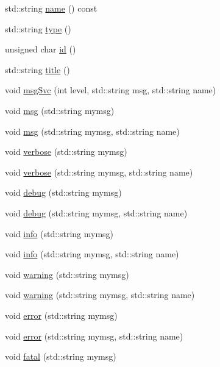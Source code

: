 \begin{DoxyCompactItemize}
\item 
std::string \hyperlink{classObject_a975e888d50bfcbffda2c86368332a5cd}{name} () const 
\item 
std::string \hyperlink{classObject_a84f99f70f144a83e1582d1d0f84e4e62}{type} ()
\item 
unsigned char \hyperlink{classObject_af99145335cc61ff6e2798ea17db009d2}{id} ()
\item 
std::string \hyperlink{classObject_a73a0f1a41828fdd8303dd662446fb6c3}{title} ()
\item 
void \hyperlink{classObject_a3f9d5537ebce0c0f2bf6ae4d92426f3c}{msgSvc} (int level, std::string msg, std::string name)
\item 
void \hyperlink{classObject_a58b2d0618c2d08cf2383012611528d97}{msg} (std::string mymsg)
\item 
void \hyperlink{classObject_ac5d59299273cee27aacf7de00d2e7034}{msg} (std::string mymsg, std::string name)
\item 
void \hyperlink{classObject_a83d2db2df682907ea1115ad721c1c4a1}{verbose} (std::string mymsg)
\item 
void \hyperlink{classObject_a2d4120195317e2a3c6532e8bb9f3da68}{verbose} (std::string mymsg, std::string name)
\item 
void \hyperlink{classObject_aac010553f022165573714b7014a15f0d}{debug} (std::string mymsg)
\item 
void \hyperlink{classObject_a6c9a0397ca804e04d675ed05683f5420}{debug} (std::string mymsg, std::string name)
\item 
void \hyperlink{classObject_a644fd329ea4cb85f54fa6846484b84a8}{info} (std::string mymsg)
\item 
void \hyperlink{classObject_a1ca123253dfd30fc28b156f521dcbdae}{info} (std::string mymsg, std::string name)
\item 
void \hyperlink{classObject_a65cd4fda577711660821fd2cd5a3b4c9}{warning} (std::string mymsg)
\item 
void \hyperlink{classObject_a11f101db4dd73d9391b0231818881d86}{warning} (std::string mymsg, std::string name)
\item 
void \hyperlink{classObject_a204a95f57818c0f811933917a30eff45}{error} (std::string mymsg)
\item 
void \hyperlink{classObject_ad7f6c457733082efa2f9ff5f5c8e119a}{error} (std::string mymsg, std::string name)
\item 
void \hyperlink{classObject_aad5a16aac7516ce65bd5ec02ab07fc80}{fatal} (std::string mymsg)
\item 

\end{DoxyCompactItemize}
